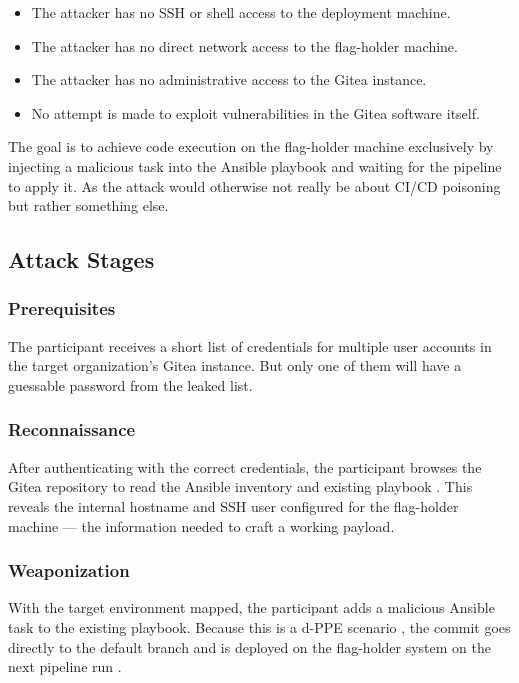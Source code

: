 \documentclass{article}
\begin{document}
\begin{itemize}
    \item The attacker has no SSH or shell access to the deployment machine.
    \item The attacker has no direct network access to the flag-holder machine.
    \item The attacker has no administrative access to the Gitea instance.
    \item No attempt is made to exploit vulnerabilities in the Gitea software itself.
\end{itemize}

The goal is to achieve code execution on the flag-holder machine exclusively by injecting a malicious task into the Ansible playbook and waiting for the pipeline to apply it. As the attack would otherwise not really be about CI/CD poisoning but rather something else.

\subsection{Attack Stages}

\subsubsection{Prerequisites}

The participant receives a short list of credentials for multiple user accounts in the target organization's Gitea instance. But only one of them will have a guessable password from the leaked list.

\subsubsection{Reconnaissance}

After authenticating with the correct credentials, the participant browses the Gitea repository to read the Ansible inventory and existing playbook \cite{mitreRecon}. This reveals the internal hostname and SSH user configured for the flag-holder machine --- the information needed to craft a working payload.

\subsubsection{Weaponization}

With the target environment mapped, the participant adds a malicious Ansible task to the existing playbook. Because this is a d-PPE scenario \cite{bishopFoxPPE}, the commit goes directly to the default branch and is deployed on the flag-holder system on the next pipeline run \cite{owaspPPE}.
\end{document}
